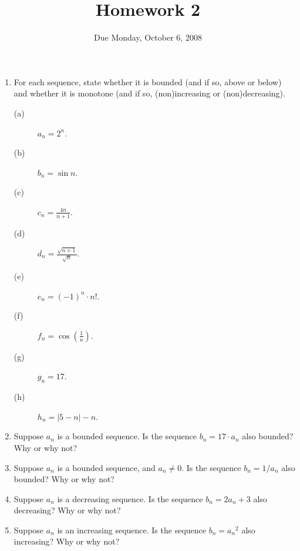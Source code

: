 \documentclass[12pt]{article}
\title{Homework 2}
\date{Due Monday, October 6, 2008}
\begin{document}
\maketitle

\begin{enumerate}
\item For each sequence, state whether it is bounded (and if so, above or below) and whether it is monotone (and if so, (non)increasing or (non)decreasing).

\begin{description}
\item[(a)] $a_n = 2^n$.
\vfill
\item[(b)] $b_n = \sin n$.
\vfill
\item[(c)] $c_n = \displaystyle\frac{4 n}{n+1}$.
\vfill
\item[(d)] $d_n = \displaystyle\frac{\sqrt{n+1}}{\sqrt{n}}$.
\vfill
\item[(e)] $e_n = (-1)^n \cdot n!$.
\vfill
\item[(f)] $f_n = \cos \displaystyle\left(\frac{1}{n}\right)$.
\vfill
\item[(g)] $g_n = 17$.
\vfill
\item[(h)] $h_n = \left|5 - n\right| - n$.
\vfill
\end{description}

\item Suppose $a_n$ is a bounded sequence.  Is the sequence $b_n = 17 \cdot a_n$ also bounded?  Why or why not?
\vfill

\item Suppose $a_n$ is a bounded sequence, and $a_n \neq 0$.  Is the sequence $b_n = 1/a_n$ also bounded?  Why or why not?
\vfill

\item Suppose $a_n$ is a decreasing sequence.  Is the sequence $b_n = 2 a_n + 3$ also decreasing?  Why or why not?
\vfill

\item Suppose $a_n$ is an increasing sequence.  Is the sequence $b_n = {a_n}^2$ also increasing?  Why or why not?
\vfill

\end{enumerate}
\end{document}
